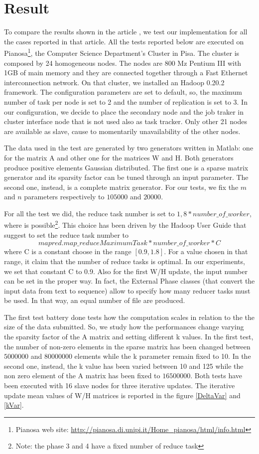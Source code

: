 \section{Result}
\label{result}

To compare the results shown in the article \cite{liu2010}, we test our implementation for all the cases reported in that article. All the tests reported below are executed on Pianosa\footnote{Pianosa web site: \url{http://pianosa.di.unipi.it/Home_pianosa/html/info.html}}, the Computer Science Department's Cluster in Pisa. The cluster is composed by 24 homogeneous nodes. The nodes are 800 Mz Pentium III with 1GB of main memory and they are connected together through a Fast Ethernet interconnection network. On that cluster, we installed an Hadoop 0.20.2 framework. The configuration parameters are set to default, so, the maximum number of task per node is set to 2 and the number of replication is set to 3. In our configuration, we decide to place the secondary node and the job traker in cluster interface node that is not used also as task tracker. Only other 21 nodes are available as slave, cause to momentarily unavailability of the other nodes.

The data used in the test are generated by two generators written in Matlab: one for the matrix A and other one for the matrices W and H. Both generators produce positive elements Gaussian distributed. The first one is a sparse matrix generator and its sparsity factor can be tuned through an input parameter. The second one, instead, is a complete matrix generator. For our tests, we fix the $m$ and $n$ parameters respectively to $105000$ and $20000$.

For all the test we did, the reduce task number is set to $ 1,8 * number\_of\_worker$, where is possible\footnote{Note: the phase 3 and 4 have a fixed number of reduce task}. This choice has been driven by the Hadoop User Guide that suggest to set the reduce task number to $$ mapred.map\_reduceMaximumTask * number\_of\_worker * C $$ where C is a constant choose in the range $[ 0.9, 1.8]$. For a value chosen in that range, it claim that the number of reduce tasks is optimal. In our experiments, we set that constant C to 0.9. Also for the first  W/H update, the input number can be set in the proper way. In fact, the External Phase classes (that convert the input data from text to sequence) allow to specify how many reducer tasks must be used. In that way, an equal number of file are produced.

The first test battery done tests how the computation scales in relation to the the size of the data submitted. So, we study how the performances change varying the sparsity factor of the A matrix and setting different k values. In the first test, the number of non-zero elements in the sparse matrix has been changed between $5000000$ and $80000000$ elements while the k parameter remain fixed to 10. In the second one, instead, the k value has been varied between 10 and 125 while the non zero element of the A matrix has been fixed to $16500000$.  Both tests have been executed with 16 slave nodes for three iterative updates. The iterative update mean values of W/H matrices is reported in the figure \ref{DeltaVar}  and \ref{kVar}. 


